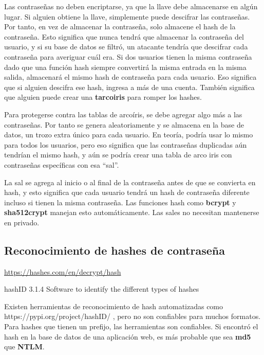 \noindent Las contraseñas no deben encriptarse, ya que la llave debe almacenarse en algún lugar. Si alguien obtiene la llave, simplemente puede descifrar las contraseñas.
%
Por tanto, en vez de almacenar la contraseña, solo almacene el hash de la contraseña.  Esto significa que nunca tendrá que almacenar la contraseña del usuario, y si su base de datos se filtró, un atacante tendría que descifrar cada contraseña para averiguar cuál era.
Si dos usuarios tienen la misma contraseña dado que una función hash siempre convertirá la misma entrada en la misma salida, almacenará el mismo hash de contraseña para cada usuario. Eso significa que si alguien descifra ese hash, ingresa a más de una cuenta. También significa que alguien puede crear una \textbf{\gls{tarcoiris}} para romper los hashes.

\begin{tcolorbox}[colback=gray!5!white,colframe=orange!60!gray,title=Protección anti tablas arcoíris] 
Para protegerse contra las tablas de arcoíris, se debe agregar algo más a las contraseñas. Por tanto se genera aleatoriamente y se almacena en la base de datos, un trozo extra único para cada usuario. En teoría, podría usar lo mismo  para todos los usuarios, pero eso significa que las contraseñas duplicadas aún tendrían el mismo hash, y aún se podría crear una tabla de arco iris con contraseñas específicas con esa ``sal''.

La sal se agrega al inicio o al final de la contraseña antes de que se convierta en hash, y esto significa que cada usuario tendrá un hash de contraseña diferente incluso si tienen la misma contraseña. Las funciones hash como \textbf{bcrypt} y \textbf{sha512crypt} manejan esto automáticamente. Las sales no necesitan mantenerse en privado.
\end{tcolorbox}


\subsection{Reconocimiento de hashes de contraseña}
\begin{tcolorbox}[colback=gray!5!white,colframe=orange!60!gray,title= online tools for cracking a hash]
\url{https://hashes.com/en/decrypt/hash}

\end{tcolorbox}

\color{red}hashID 3.1.4  Software to identify the different types of hashes \color{black}


Existen herramientas de reconocimiento de hash automatizadas como  https://pypi.org/project/hashID/  , pero no son confiables para muchos formatos. Para hashes que tienen un prefijo, las herramientas son confiables. Si encontró el hash en la base de datos de una aplicación web, es más probable que sea \textbf{md5} que \textbf{NTLM}. 

